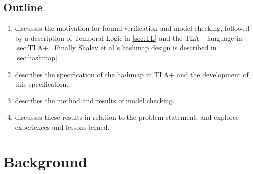 \documentclass{uit-thesis}
\begin{document}
\section{Outline}
\begin{enumerate}[label={}]
    \item \textbf{} discusses the motivation for formal verification and model checking, followed by a description of Temporal Logic in \autoref{sec:TL} and the TLA+ language in \autoref{sec:TLA+}. Finally Shalev et al.'s hashmap design is described in \autoref{sec:hashmap}.
    \item \textbf{} describes the specification of the hashmap in TLA+ and the development of this specification.
    \item \textbf{} describes the method and results of model checking.
    \item \textbf{} discusses these results in relation to the problem statement, and explores experiences and lessons lerned.
\end{enumerate}


\chapter{Background}\label{ch:background}
\end{document}
